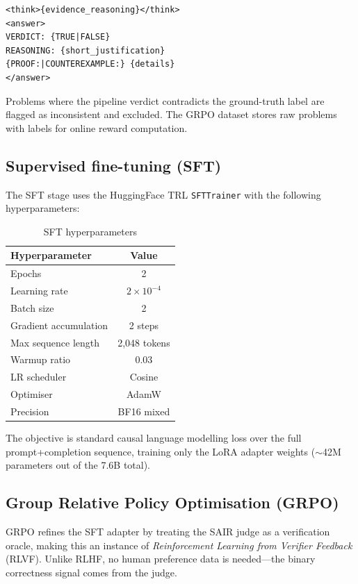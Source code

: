 \documentclass{article}
\begin{document}
\begin{verbatim}
<think>{evidence_reasoning}</think>
<answer>
VERDICT: {TRUE|FALSE}
REASONING: {short_justification}
{PROOF:|COUNTEREXAMPLE:} {details}
</answer>
\end{verbatim}

Problems where the pipeline verdict contradicts the ground-truth label are flagged as inconsistent and excluded. The GRPO dataset stores raw problems with labels for online reward computation.

\subsection{Supervised fine-tuning (SFT)}
\label{sec:sft}

The SFT stage uses the HuggingFace TRL \texttt{SFTTrainer} with the following hyperparameters:

\begin{table}[h]
  \caption{SFT hyperparameters}
  \label{tab:sft}
  \centering
  \begin{tabular}{lc}
    \toprule
    Hyperparameter & Value \\
    \midrule
    Epochs & 2 \\
    Learning rate & $2 \times 10^{-4}$ \\
    Batch size & 2 \\
    Gradient accumulation & 2 steps \\
    Max sequence length & 2,048 tokens \\
    Warmup ratio & 0.03 \\
    LR scheduler & Cosine \\
    Optimiser & AdamW \\
    Precision & BF16 mixed \\
    \bottomrule
  \end{tabular}
\end{table}

The objective is standard causal language modelling loss over the full prompt+completion sequence, training only the LoRA adapter weights ($\sim$42M parameters out of the 7.6B total).

\subsection{Group Relative Policy Optimisation (GRPO)}
\label{sec:grpo}

GRPO refines the SFT adapter by treating the SAIR judge as a verification oracle, making this an instance of \emph{Reinforcement Learning from Verifier Feedback} (RLVF). Unlike RLHF, no human preference data is needed---the binary correctness signal comes from the judge.
\end{document}
